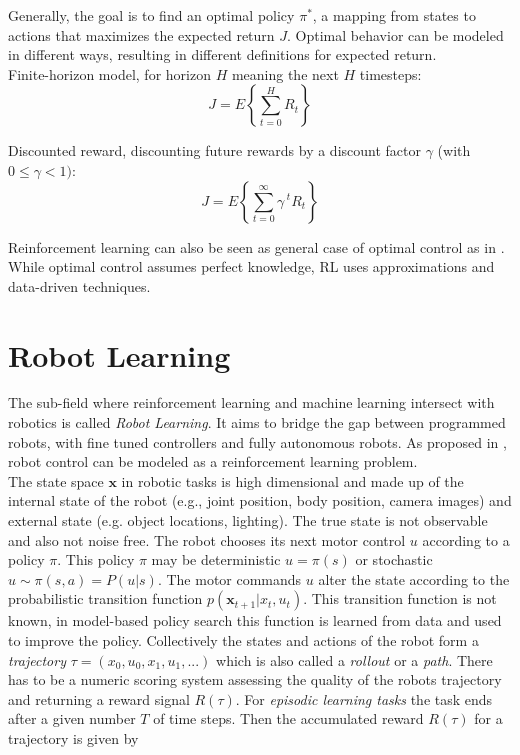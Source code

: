 Generally, the goal is to find an optimal policy $\pi^*$,
a mapping from states to actions that
maximizes the expected return $J$.
Optimal behavior can be modeled in
different ways, resulting in different
definitions for expected return. \\
Finite-horizon model, for horizon $H$ meaning the next $H$ timesteps:
$$ J = E \left\{\sum^H_{t=0} R_t \right\} $$

Discounted reward, discounting future rewards by a discount factor $\gamma$
(with $0 \leq \gamma < 1)$:
$$ J = E \left\{\sum^{\infty}_{t=0} \gamma^{\; t} R_t \right\} $$


Reinforcement learning can also be seen as
general case of optimal control as in \citet{sutton1992reinforcement}.
While optimal control assumes perfect knowledge, RL uses approximations
and data-driven techniques.



\section{Robot Learning}
The sub-field where reinforcement learning and machine learning
intersect with robotics is called \textit{Robot Learning}. It aims to bridge
the gap between programmed robots,
with fine tuned controllers  and fully autonomous robots.
As proposed in \citet{deisenroth2013survey}, robot control can be modeled as
a reinforcement learning problem. \\
The state space $\mathbf{x}$ in robotic tasks is high dimensional and
made up of
the internal state of the robot (e.g., joint position, body position,
camera images)
and external state (e.g. object locations, lighting). The true state is
not observable and also not noise free. 
The robot chooses its next motor control $u$ according to a policy $\pi$.
This policy $\pi$ may
be deterministic $u = \pi(s)$ or stochastic $u \sim \pi(s,a) = P(u | s)$.
The motor commands $u$ alter the state according to the probabilistic
transition function $p(\mathbf{x}_{t+1} | x_t, u_t)$. This transition function
is not known, in model-based policy search this function is learned from data and
used to improve the policy.
Collectively the states and actions of the robot form a
\textit{trajectory} $\tau = (x_0, u_0, x_1, u_1,...)$ which is also called
a \textit{rollout} or a \textit{path}.
There has to be a numeric scoring system assessing the quality
of the robots trajectory and returning a reward signal $R(\tau)$.
For \textit{episodic learning tasks} the task ends after a given number $T$ of time
steps. Then the accumulated reward $R(\tau)$ for a trajectory is given by

